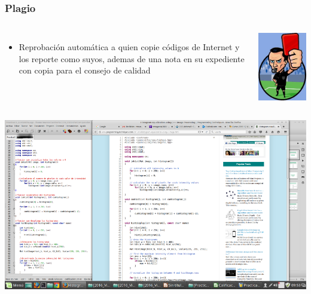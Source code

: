 \documentclass[aspectratio=169]{beamer}
\begin{document}
\begin{frame}
\frametitle{Plagio}
\begin{columns}[c] %
\begin{itemize}
\item Reprobación automática a quien copie códigos de Internet y los reporte como suyos, ademas de una nota en su expediente con copia para el consejo de calidad 
\end{itemize}
\begin{center}
\includegraphics[scale=0.27]{tarjeta-roja}
\end{center}
\end{columns}
\begin{center}
\includegraphics[scale=0.23]{Pifia}
\end{center}
\end{frame}
\end{document}
